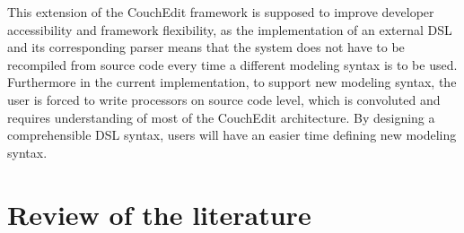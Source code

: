 \documentclass[10pt,a4paper,oneside]{scrartcl}
\newcommand\hint[2]{
\ifthenelse{\boolean{showhints}}{
\begin{center}
\colorbox{black!10}{
\begin{minipage}{.963\textwidth}
#2\hfill\textbf{#1}
\end{minipage}
}\end{center}}{}
}
\begin{document}
This extension of the CouchEdit framework is supposed to improve developer accessibility and framework flexibility, as the implementation of an external DSL and its corresponding parser means that the system does not have to be recompiled from source code every time a different modeling syntax is to be used. Furthermore in the current implementation, to support new modeling syntax, the user is forced to write processors on source code level, which is convoluted and requires understanding of most of the CouchEdit architecture. By designing a comprehensible DSL syntax, users will have an easier time defining new modeling syntax.



\section{Review of the literature}




\end{document}
